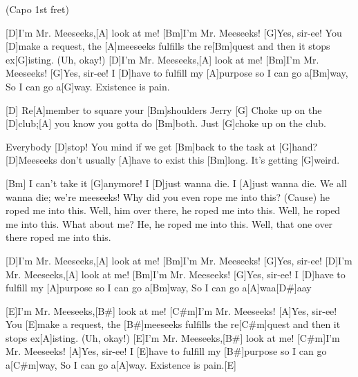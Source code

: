 
{\footnotesize(Capo 1st fret)}

\begin{guitar}
	[D]I'm Mr. Meeseeks,[A] look at me! [Bm]I'm Mr. Meeseeks! [G]Yes, sir-ee!
	You [D]make a request, the [A]meeseeks fulfills the re[Bm]quest and then it stops ex[G]isting. (Uh, okay!)
	[D]I'm Mr. Meeseeks,[A] look at me! [Bm]I'm Mr. Meeseeks! [G]Yes, sir-ee!
	I [D]have to fulfill my [A]purpose so I can go a[Bm]way,
	So I can go a[G]way. Existence is pain.
	
	[D] Re[A]member to square your [Bm]shoulders Jerry [G]{}
	Choke up on the [D]club;[A] you know you gotta do [Bm]both. Just [G]choke up on the club.
	
	 
	
	Everybody [D]stop! You mind if we get [Bm]back to the task at [G]hand? 
	[D]Meeseeks don't usually [A]have to exist this [Bm]long. It's getting [G]weird.
	
	 
	
	[Bm] I can't take it [G]anymore! I [D]just wanna die. I [A]just wanna die.
	We all wanna die; we're meeseeks! Why did you even rope me into this?
	(Cause) he roped me into this. Well, him over there, he roped me into this. Well, he roped me into this. 
	What about me? He, he roped me into this. Well, that one over there roped me into this.
	
	[D]I'm Mr. Meeseeks,[A] look at me! [Bm]I'm Mr. Meeseeks! [G]Yes, sir-ee!
	[D]I'm Mr. Meeseeks,[A] look at me! [Bm]I'm Mr. Meeseeks! [G]Yes, sir-ee!
	I [D]have to fulfill my [A]purpose so I can go a[Bm]way,
	So I can go a[A]waa[D#]aay
	
	[E]I'm Mr. Meeseeks,[B#] look at me! [C#m]I'm Mr. Meeseeks! [A]Yes, sir-ee!
	You [E]make a request, the [B#]meeseeks fulfills the re[C#m]quest and then it stops ex[A]isting. (Uh, okay!)
	[E]I'm Mr. Meeseeks,[B#] look at me! [C#m]I'm Mr. Meeseeks! [A]Yes, sir-ee!
	I [E]have to fulfill my [B#]purpose so I can go a[C#m]way,
	So I can go a[A]way. Existence is pain.[E]{}
\end{guitar}